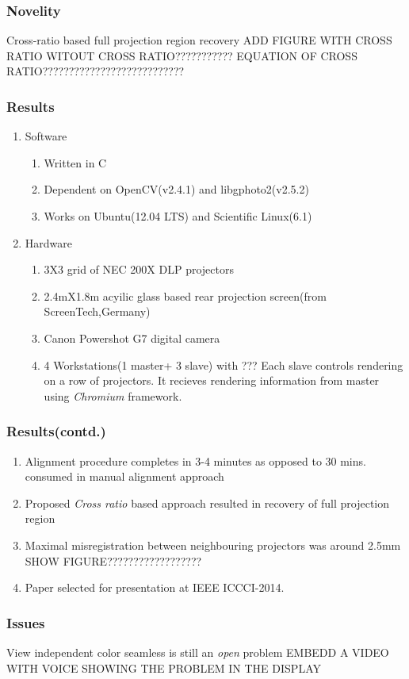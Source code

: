 \documentclass{beamer}
\begin{document}
\begin{frame}
\frametitle{Novelity}
Cross-ratio based full projection region recovery
ADD FIGURE WITH CROSS RATIO WITOUT CROSS RATIO???????????
EQUATION OF CROSS RATIO???????????????????????????
\end{frame}

\begin{frame}
\frametitle{Results}
\begin{enumerate}
\item Software
\begin{enumerate}
\item Written in C
\item Dependent on OpenCV(v2.4.1) and libgphoto2(v2.5.2)
\item Works on Ubuntu(12.04 LTS) and Scientific Linux(6.1)
\end{enumerate}      
\item Hardware
\begin{enumerate}
\item 3X3 grid of NEC 200X DLP projectors
\item 2.4mX1.8m acyilic glass based rear projection screen(from ScreenTech,Germany)
\item Canon Powershot G7 digital camera
\item 4 Workstations(1 master+ 3 slave) with ???\newline
Each slave controls rendering on a row of projectors. It recieves rendering information from master using \textit{Chromium} framework.
\end{enumerate}
\end{enumerate}
\end{frame}

\begin{frame}
\frametitle{Results(contd.)}
\begin{enumerate}
\item Alignment procedure completes in 3-4 minutes as opposed to 30 mins. consumed in manual alignment approach
\item Proposed \textit{Cross ratio} based approach resulted in recovery of full projection region
\item Maximal misregistration between neighbouring projectors was around 2.5mm
SHOW FIGURE??????????????????
\item Paper selected for presentation at IEEE ICCCI-2014.
\end{enumerate}
\end{frame}


\begin{frame}
\frametitle{Issues}
View independent color seamless is still an \textit{open} problem
EMBEDD A VIDEO WITH VOICE SHOWING THE PROBLEM IN THE DISPLAY
\end{frame}
\end{document}

